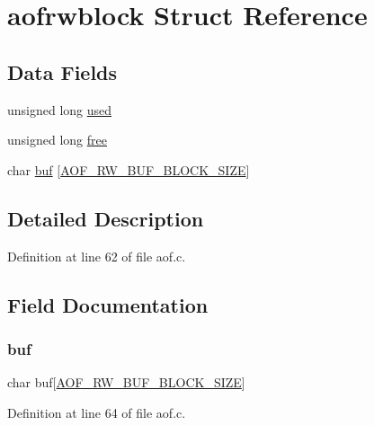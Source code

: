 \hypertarget{structaofrwblock}{}\section{aofrwblock Struct Reference}
\label{structaofrwblock}
\subsection*{Data Fields}
\begin{DoxyCompactItemize}
\item 
unsigned long \hyperlink{structaofrwblock_abeece48b2d7c09bffa9101df617478d0}{used}
\item 
unsigned long \hyperlink{structaofrwblock_a848d934dac452375a7127376257068b3}{free}
\item 
char \hyperlink{structaofrwblock_aa79f9212f560356c73863debd9af5bc3}{buf} \mbox{[}\hyperlink{aof_8c_a44139ff5d81f229e77d843b17ada505e}{A\+O\+F\+\_\+\+R\+W\+\_\+\+B\+U\+F\+\_\+\+B\+L\+O\+C\+K\+\_\+\+S\+I\+ZE}\mbox{]}
\end{DoxyCompactItemize}


\subsection{Detailed Description}


Definition at line 62 of file aof.\+c.



\subsection{Field Documentation}
\mbox{\label{structaofrwblock_aa79f9212f560356c73863debd9af5bc3}} 
\subsubsection{\texorpdfstring{buf}{buf}}
{\footnotesize\ttfamily char buf\mbox{[}\hyperlink{aof_8c_a44139ff5d81f229e77d843b17ada505e}{A\+O\+F\+\_\+\+R\+W\+\_\+\+B\+U\+F\+\_\+\+B\+L\+O\+C\+K\+\_\+\+S\+I\+ZE}\mbox{]}}



Definition at line 64 of file aof.\+c.

\mbox{\label{structaofrwblock_a848d934dac452375a7127376257068b3}} 
